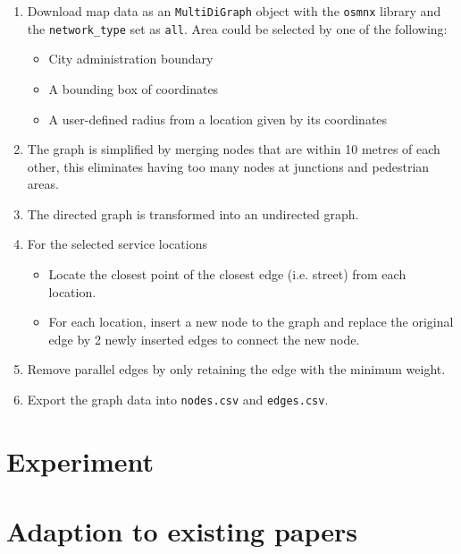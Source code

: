\begin{enumerate}
    \item Download map data as an \verb|MultiDiGraph| object with the \verb|osmnx| library and the \verb|network_type| set as \verb|all|. Area could be selected by one of the following:
    \begin{itemize}
        \item City administration boundary
        \item A bounding box of coordinates
        \item A user-defined radius from a location given by its coordinates
    \end{itemize}
    \item The graph is simplified by merging nodes that are within 10 metres of each other, this eliminates having too many nodes at junctions and pedestrian areas.
    \item The directed graph is transformed into an undirected graph.
    \item For the selected service locations
    \begin{itemize}
        \item Locate the closest point of the closest edge (i.e. street) from each location.
        \item For each location, insert a new node to the graph and replace the original edge by 2 newly inserted edges to connect the new node.
    \end{itemize}
    \item Remove parallel edges by only retaining the edge with the minimum weight.
    \item Export the graph data into \verb|nodes.csv| and \verb|edges.csv|.
\end{enumerate}






\section{Experiment}

\section{Adaption to existing papers}
